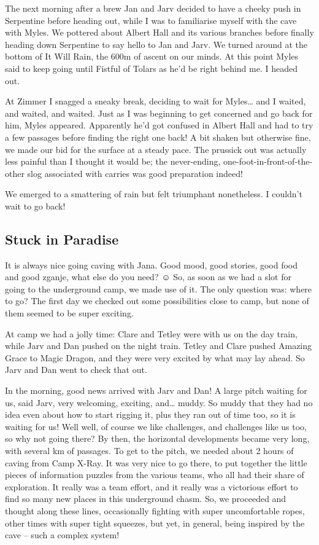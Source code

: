 The next morning after a brew Jan and Jarv decided to have a cheeky push
in Serpentine before heading out, while I was to familiarise myself with
the cave with Myles. We pottered about Albert Hall and its various
branches before finally heading down Serpentine to say hello to Jan and
Jarv. We turned around at the bottom of It Will Rain, the 600m of ascent
on our minds. At this point Myles said to keep going until Fistful of
Tolars as he'd be right behind me. I headed out.

At Zimmer I snagged a sneaky break, deciding to wait for Myles\ldots{}
and I waited, and waited, and waited. Just as I was beginning to get
concerned and go back for him, Myles appeared. Apparently he'd got
confused in Albert Hall and had to try a few passages before finding the
right one back! A bit shaken but otherwise fine, we made our bid for the
surface at a steady pace. The prussick out was actually less painful
than I thought it would be; the never-ending,
one-foot-in-front-of-the-other slog associated with carries was good
preparation indeed!

We emerged to a smattering of rain but felt triumphant nonetheless. I
couldn't wait to go back!


\hypertarget{stuck-in-paradise}{%
\subsection{Stuck in Paradise}\label{stuck-in-paradise}}

It is always nice going caving with Jana. Good mood, good stories, good
food and good zganje, what else do you need? ☺ So, as soon as we had a
slot for going to the underground camp, we made use of it. The only
question was: where to go? The first day we checked out some
possibilities close to camp, but none of them seemed to be super
exciting.

At camp we had a jolly time: Clare and Tetley were with us on the day
train, while Jarv and Dan pushed on the night train. Tetley and Clare
pushed Amazing Grace to Magic Dragon, and they were very excited by what
may lay ahead. So Jarv and Dan went to check that out.

In the morning, good news arrived with Jarv and Dan! A large pitch
waiting for us, said Jarv, very welcoming, exciting, and\ldots{} muddy.
So muddy that they had no idea even about how to start rigging it, plus
they ran out of time too, so it is waiting for us! Well well, of course
we like challenges, and challenges like us too, so why not going there?
By then, the horizontal developments became very long, with several km
of passages. To get to the pitch, we needed about 2 hours of caving from
Camp X-Ray. It was very nice to go there, to put together the little
pieces of information puzzles from the various teams, who all had their
share of exploration. It really was a team effort, and it really was a
victorious effort to find so many new places in this underground chasm.
So, we proceeded and thought along these lines, occasionally fighting
with super uncomfortable ropes, other times with super tight squeezes,
but yet, in general, being inspired by the cave -- such a complex
system!

